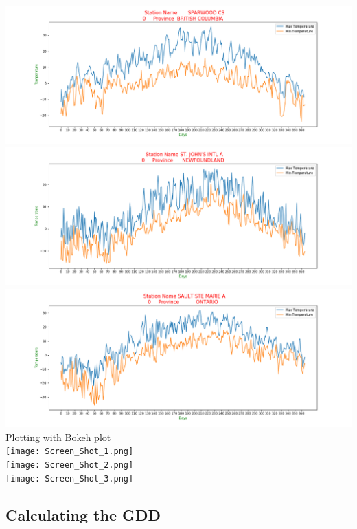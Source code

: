 \includegraphics[scale=0.35]{Fig_6842_2015.png}\\

\includegraphics[scale=0.35]{Fig_50089_2015.png}\\

\includegraphics[scale=0.35]{Fig_50092_2015.png}\\

Plotting with Bokeh plot\\

\texttt{[image: Screen\_Shot\_1.png]}\\
\texttt{[image: Screen\_Shot\_2.png]}\\
\texttt{[image: Screen\_Shot\_3.png]}\\



\subsection{Calculating the GDD}

